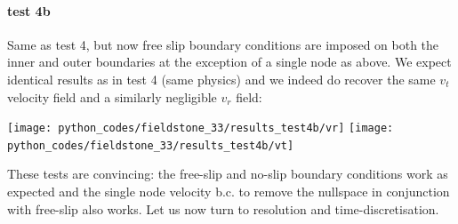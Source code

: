 \paragraph{test 4b} Same as test 4, but now free slip boundary conditions are imposed on both the 
inner and outer boundaries at the exception of a single node as above. 
We expect identical results as in test 4 (same physics) and we indeed do recover the same
$v_t$ velocity field and a similarly negligible $v_r$ field:

\begin{center}
\texttt{[image: python\_codes/fieldstone\_33/results\_test4b/vr]}
\texttt{[image: python\_codes/fieldstone\_33/results\_test4b/vt]}
\end{center}

These tests are convincing: the free-slip and no-slip boundary conditions work as expected 
and the single node velocity b.c. to remove the nullspace in conjunction with free-slip also 
works. 
Let us now turn to resolution and time-discretisation. 


